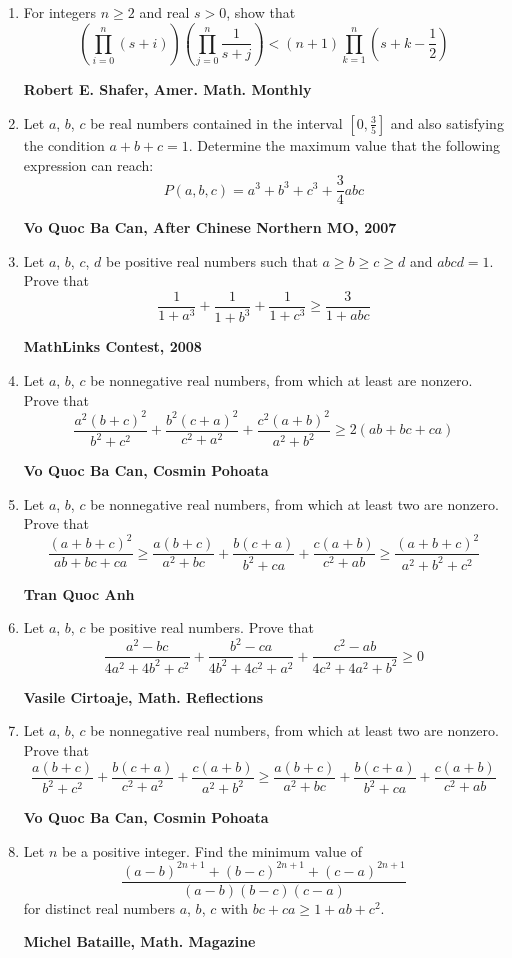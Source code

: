 \documentclass{article}
\begin{document}
\begin{enumerate}
\pagebreak

\item For integers $n \geq 2$ and real $s > 0$, show that$$\left(\prod \limits_{i=0}^n(s+i)\right)\left(\prod \limits_{j=0}^n\frac{1}{s+j}\right)<(n+1)\prod \limits_{k=1}^n\left(s+k-\frac{1}{2}\right)$$
\begin{flushright}
	\textbf{Robert E. Shafer, Amer. Math. Monthly}
\end{flushright}
\item Let $a$, $b$, $c$ be real numbers contained in the interval $\left[0, \frac{3}{5}\right]$ and also satisfying the condition $a + b + c = 1$.  Determine the maximum value that the following expression can reach: $$P(a,b,c)=a^3+b^3+c^3+\frac{3}{4}abc$$
\begin{flushright}
	\textbf{Vo Quoc Ba Can, After Chinese Northern MO, 2007}
\end{flushright}
\item Let $a$, $b$, $c$, $d$ be positive real numbers such that $a \geq b \geq c \geq d$ and $abcd=1$. Prove that $$\frac{1}{1+a^3}+\frac{1}{1+b^3}+\frac{1}{1+c^3}\geq \frac{3}{1+abc}$$
\begin{flushright}
	\textbf{MathLinks Contest, 2008}
\end{flushright}
\item Let $a$, $b$, $c$ be nonnegative real numbers, from which at least are nonzero. Prove that $$\frac{a^2(b+c)^2}{b^2+c^2}+\frac{b^2(c+a)^2}{c^2+a^2}+\frac{c^2(a+b)^2}{a^2+b^2}\geq 2(ab+bc+ca)$$
\begin{flushright}
	\textbf{Vo Quoc Ba Can, Cosmin Pohoata}
\end{flushright}
\item Let $a$, $b$, $c$ be nonnegative real numbers, from which at least two are nonzero. Prove that$$\frac{(a+b+c)^2}{ab+bc+ca}\geq \frac{a(b+c)}{a^2+bc}+\frac{b(c+a)}{b^2+ca}+\frac{c(a+b)}{c^2+ab}\geq\frac{(a+b+c)^2}{a^2+b^2+c^2}$$
\begin{flushright}
	\textbf{Tran Quoc Anh}
\end{flushright}
\item Let $a$, $b$, $c$ be positive real numbers. Prove that$$\frac{a^2-bc}{4a^2+4b^2+c^2}+\frac{b^2-ca}{4b^2+4c^2+a^2}+\frac{c^2-ab}{4c^2+4a^2+b^2}\geq 0$$
\begin{flushright}
	\textbf{Vasile Cirtoaje, Math. Reflections}
\end{flushright}
\item Let $a$, $b$, $c$ be nonnegative real numbers, from which at least two are nonzero. Prove that $$\frac{a(b+c)}{b^2+c^2}+\frac{b(c+a)}{c^2+a^2}+\frac{c(a+b)}{a^2+b^2}\geq \frac{a(b+c)}{a^2+bc}+\frac{b(c+a)}{b^2+ca}+\frac{c(a+b)}{c^2+ab}$$
\begin{flushright}
	\textbf{Vo Quoc Ba Can, Cosmin Pohoata}
\end{flushright}
\item Let $n$ be a positive integer. Find the minimum value of$$\frac{(a-b)^{2n+1}+(b-c)^{2n+1}+(c-a)^{2n+1}}{(a-b)(b-c)(c-a)}$$for distinct real numbers $a$, $b$, $c$ with $bc + ca \geq 1 + ab + c^2$.
\begin{flushright}
	\textbf{Michel Bataille, Math. Magazine}
\end{flushright}


\end{enumerate}
\end{document}
